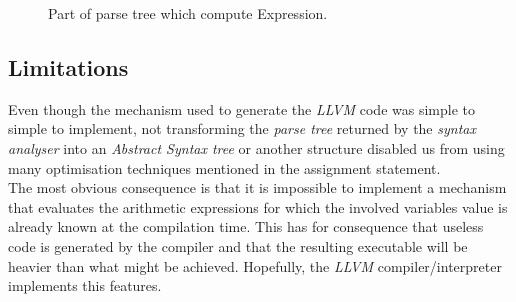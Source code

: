 \documentclass[a4paper,11pt]{article}
\begin{document}
    \begin{figure}[h!]
      \centering
      \caption{Part of parse tree which compute Expression.}
      \label{fig:addition_states}
    \end{figure}
    
  \subsection{Limitations}
    \label{semantic-limitations}
    Even though the mechanism used to generate the \textit{LLVM} code was simple to simple to implement, not transforming the \textit{parse tree} returned by the \textit{syntax analyser} into an \textit{Abstract Syntax tree} or another structure disabled us from using many optimisation techniques mentioned in the assignment statement.\\
    The most obvious consequence is that it is impossible to implement a mechanism that evaluates the arithmetic expressions for which the involved variables value is already known at the compilation time. This has for consequence that useless code is generated by the compiler and that the resulting executable will be heavier than what might be achieved. Hopefully, the \textit{LLVM} compiler/interpreter implements this features.
  
\end{document}
